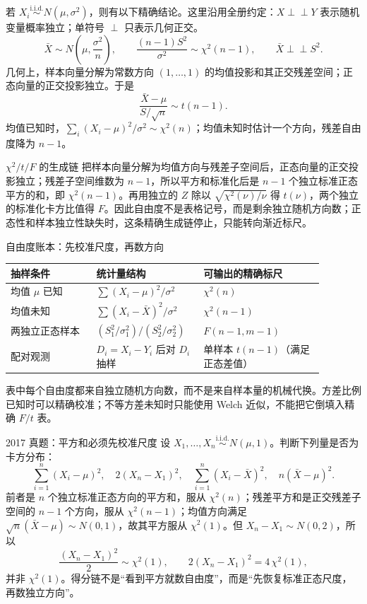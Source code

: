 \documentclass[11pt,a4paper]{ctexart}
\newcommand{\indep}{\mathrel{\perp\!\!\!\perp}}
\begin{document}
若 $X_i\overset{\mathrm{i.i.d.}}\sim N(\mu,\sigma^2)$，则有以下精确结论。这里沿用全册约定：$X\indep Y$ 表示随机变量概率独立；单符号 $\perp$ 只表示几何正交。
\[
\bar X\sim N\left(\mu,\frac{\sigma^2}{n}\right),\qquad
\frac{(n-1)S^2}{\sigma^2}\sim\chi^2(n-1),\qquad \bar X\indep S^2.
\]
几何上，样本向量分解为常数方向 $(1,\ldots,1)$ 的均值投影和其正交残差空间；正态向量的正交投影独立。于是
\[
\frac{\bar X-\mu}{S/\sqrt n}\sim t(n-1).
\]
均值已知时，$\sum_i(X_i-\mu)^2/\sigma^2\sim\chi^2(n)$；均值未知时估计一个方向，残差自由度降为 $n-1$。

\begin{methodbox}{$\chi^2/t/F$ 的生成链}
把样本向量分解为均值方向与残差子空间后，正态向量的正交投影独立；残差子空间维数为 $n-1$，所以平方和标准化后是 $n-1$ 个独立标准正态平方的和，即 $\chi^2(n-1)$。再用独立的 $Z$ 除以 $\sqrt{\chi^2(\nu)/\nu}$ 得 $t(\nu)$，两个独立的标准化卡方比值得 $F$。因此自由度不是表格记号，而是剩余独立随机方向数；正态性和样本独立性缺失时，这条精确生成链停止，只能转向渐近标尺。
\end{methodbox}

\begin{methodbox}{自由度账本：先校准尺度，再数方向}
\begin{tabularx}{\linewidth}{L{0.25\linewidth}L{0.28\linewidth}L{0.35\linewidth}}
\toprule
抽样条件 & 统计量结构 & 可输出的精确标尺 \\
\midrule
均值 $\mu$ 已知 & $\sum(X_i-\mu)^2/\sigma^2$ & $\chi^2(n)$ \\
均值未知 & $\sum(X_i-\bar X)^2/\sigma^2$ & $\chi^2(n-1)$ \\
两独立正态样本 & $(S_1^2/\sigma_1^2)/(S_2^2/\sigma_2^2)$ & $F(n-1,m-1)$ \\
配对观测 & $D_i=X_i-Y_i$ 后对 $D_i$ 抽样 & 单样本 $t(n-1)$（满足正态差值） \\
\bottomrule
\end{tabularx}

表中每个自由度都来自独立随机方向数，而不是来自样本量的机械代换。方差比例已知时可以精确校准；不等方差未知时只能使用 Welch 近似，不能把它倒填入精确 $F/t$ 表。
\end{methodbox}

\begin{examplebox}{2017 真题：平方和必须先校准尺度}
设 $X_1,\ldots,X_n\overset{\mathrm{i.i.d.}}\sim N(\mu,1)$。判断下列量是否为卡方分布：
\[
\sum_{i=1}^n(X_i-\mu)^2,\quad 2(X_n-X_1)^2,\quad
\sum_{i=1}^n(X_i-\bar X)^2,\quad n(\bar X-\mu)^2.
\]
前者是 $n$ 个独立标准正态方向的平方和，服从 $\chi^2(n)$；残差平方和是正交残差子空间的 $n-1$ 个方向，服从 $\chi^2(n-1)$；均值方向满足 $\sqrt n(\bar X-\mu)\sim N(0,1)$，故其平方服从 $\chi^2(1)$。但 $X_n-X_1\sim N(0,2)$，所以
\[
\frac{(X_n-X_1)^2}{2}\sim\chi^2(1),\qquad
2(X_n-X_1)^2=4\,\chi^2(1),
\]
并非 $\chi^2(1)$。得分链不是“看到平方就数自由度”，而是“先恢复标准正态尺度，再数独立方向”。
\end{examplebox}
\end{document}
